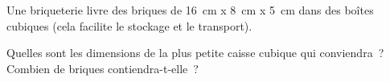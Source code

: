 %
%
Une briqueterie livre des briques de \SI{16}{cm} x \SI{8}{cm} x \SI{5}{cm} dans des boîtes cubiques (cela facilite le stockage et le transport).
    \begin{tasks}
        \task Quelles sont les dimensions de la plus petite caisse cubique qui conviendra~?
        \task Combien de briques contiendra-t-elle~?
    \end{tasks}
